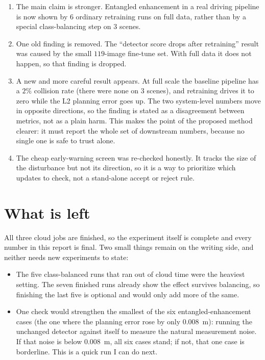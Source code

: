 \documentclass[11pt,a4paper]{article}
\begin{document}
\begin{enumerate}[leftmargin=*]
    \item The main claim is stronger. Entangled enhancement in a real driving
          pipeline is now shown by $6$ ordinary retraining runs on full data,
          rather than by a special class-balancing step on $3$ scenes.

    \item One old finding is removed. The ``detector score drops after
          retraining'' result was caused by the small $119$-image fine-tune set.
          With full data it does not happen, so that finding is dropped.

    \item A new and more careful result appears. At full scale the baseline
          pipeline has a $2\%$ collision rate (there were none on $3$ scenes), and
          retraining drives it to zero while the L2 planning error goes up. The two
          system-level numbers move in opposite directions, so the finding is
          stated as a disagreement between metrics, not as a plain harm. This makes
          the point of the proposed method clearer: it must report the whole set of
          downstream numbers, because no single one is safe to trust alone.

    \item The cheap early-warning screen was re-checked honestly. It tracks the
          size of the disturbance but not its direction, so it is a way to
          prioritize which updates to check, not a stand-alone accept or reject
          rule.
\end{enumerate}

\section{What is left}

All three cloud jobs are finished, so the experiment itself is complete and every
number in this report is final. Two small things remain on the writing side, and
neither needs new experiments to state:

\begin{itemize}[leftmargin=*]
    \item The five class-balanced runs that ran out of cloud time were the heaviest
          setting. The seven finished runs already show the effect survives
          balancing, so finishing the last five is optional and would only add more
          of the same.
    \item One check would strengthen the smallest of the six entangled-enhancement
          cases (the one where the planning error rose by only $0.008$~m): running
          the unchanged detector against itself to measure the natural measurement
          noise. If that noise is below $0.008$~m, all six cases stand; if not, that
          one case is borderline. This is a quick run I can do next.
\end{itemize}
\end{document}
